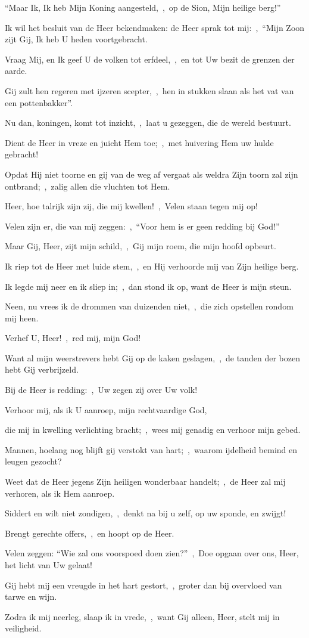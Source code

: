 \documentclass[12pt,twoside,a5paper]{article}
\begin{document}
\begin{halfparskip}
  ``Maar Ik, Ik heb Mijn Koning aangesteld,~\sep\ op de Sion, Mijn heilige berg!''

  Ik wil het besluit van de Heer bekendmaken: de Heer sprak tot mij:~\sep\ ``Mijn Zoon zijt Gij, Ik heb U heden voortgebracht.

  Vraag Mij, en Ik geef U de volken tot erfdeel,~\sep\ en tot Uw bezit de grenzen der aarde.

  Gij zult hen regeren met ijzeren scepter,~\sep\ hen in stukken slaan als het vat van een pottenbakker''.

  Nu dan, koningen, komt tot inzicht,~\sep\ laat u gezeggen, die de wereld bestuurt.

  Dient de Heer in vreze en juicht Hem toe;~\sep\ met huivering Hem uw hulde gebracht!

  Opdat Hij niet toorne en gij van de weg af vergaat als weldra Zijn toorn zal zijn ontbrand;~\sep\ zalig allen die vluchten tot Hem.

   Heer, hoe talrijk zijn zij, die mij kwellen!~\sep\ Velen staan tegen mij op!

  Velen zijn er, die van mij zeggen:~\sep\ ``Voor hem is er geen redding bij God!''

  Maar Gij, Heer, zijt mijn schild,~\sep\ Gij mijn roem, die mijn hoofd opbeurt.

  Ik riep tot de Heer met luide stem,~\sep\ en Hij verhoorde mij van Zijn heilige berg.

  Ik legde mij neer en ik sliep in;~\sep\ dan stond ik op, want de Heer is mijn steun.

  Neen, nu vrees ik de drommen van duizenden niet,~\sep\ die zich opstellen rondom mij heen.

  Verhef U, Heer!~\sep\ red mij, mijn God!

  Want al mijn weerstrevers hebt Gij op de kaken geslagen,~\sep\ de tanden der bozen hebt Gij verbrijzeld.

  Bij de Heer is redding:~\sep\ Uw zegen zij over Uw volk!

   Verhoor mij, als ik U aanroep, mijn rechtvaardige God,

  die mij in kwelling verlichting bracht;~\sep\ wees mij genadig en verhoor mijn gebed.

  Mannen, hoelang nog blijft gij verstokt van hart;~\sep\ waarom ijdelheid bemind en leugen gezocht?

  Weet dat de Heer jegens Zijn heiligen wonderbaar handelt;~\sep\ de Heer zal mij verhoren, als ik Hem aanroep.

  Siddert en wilt niet zondigen,~\sep\ denkt na bij u zelf, op uw sponde, en zwijgt!

  Brengt gerechte offers,~\sep\ en hoopt op de Heer.

  Velen zeggen: ``Wie zal ons voorspoed doen zien?''~\sep\ Doe opgaan over ons, Heer, het licht van Uw gelaat!

  Gij hebt mij een vreugde in het hart gestort,~\sep\ groter dan bij overvloed van tarwe en wijn.

  Zodra ik mij neerleg, slaap ik in vrede,~\sep\ want Gij alleen, Heer, stelt mij in veiligheid.
\end{halfparskip}
\end{document}
